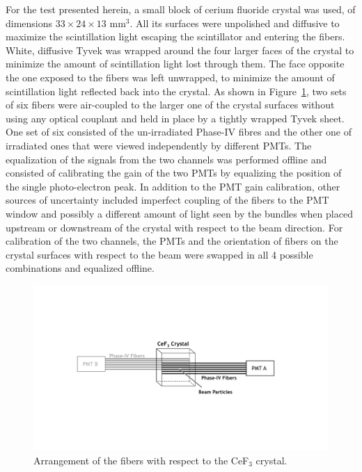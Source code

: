 \documentclass[a4paper,11pt]{article}
\begin{document}
For the test presented herein, a small block of cerium fluoride crystal was used, of dimensions $33\times 24 \times13$ mm$^3$. All its surfaces were unpolished and diffusive to maximize the scintillation light escaping the scintillator and entering the fibers. White, diffusive Tyvek was wrapped around the four larger faces of the crystal to minimize the amount of scintillation light lost through them. The face opposite the one exposed to the fibers was left unwrapped, to minimize the amount of scintillation light reflected back into the crystal.  As shown in Figure~\ref{fig:CeF3Arrangement}, two sets of six fibers were air-coupled to the larger one of the crystal surfaces without using any optical couplant and held in place by a tightly wrapped Tyvek sheet. One set of six consisted of the un-irradiated Phase-IV fibres and the other one of irradiated ones that were viewed independently by different PMTs. The equalization of the signals from the two channels was performed offline and consisted of calibrating the gain of the two PMTs by equalizing the position of the single photo-electron peak. In addition to the PMT gain calibration, other sources of uncertainty included imperfect coupling of the fibers to the PMT window and possibly a different amount of light seen by the bundles when placed upstream or downstream of the crystal with respect to the beam direction. For calibration of the two channels, the PMTs and the orientation of fibers on the crystal surfaces with respect to the beam were swapped in all 4 possible combinations and equalized offline.
\begin{figure}[ht]
\begin{center}\vspace{-1pc}
      \includegraphics[width=14 cm]{Figures/CeF3Arrangement.pdf}
\caption{\small Arrangement of the fibers with respect to the CeF$_3$ crystal.}
    \label{fig:CeF3Arrangement}
\end{center}
\end{figure}
\end{document}

